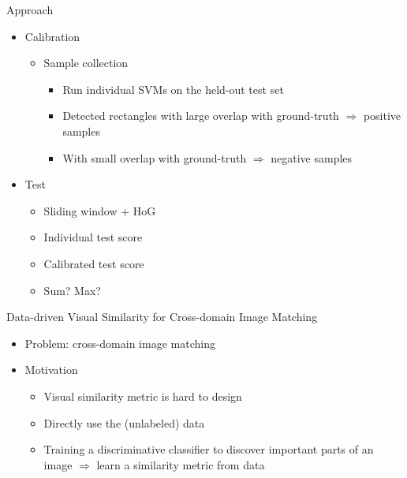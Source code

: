 \documentclass[12pt]{beamer}
\begin{document}
\begin{frame}{Approach}
	\begin{itemize}
		\item Calibration
		\begin{itemize}
			\item Sample collection
			\begin{itemize}
				\item Run individual SVMs on the held-out test set
                \item Detected rectangles with large overlap with ground-truth $\Rightarrow$ positive samples
				\item With small overlap with ground-truth $\Rightarrow$ negative samples
			\end{itemize}
		\end{itemize}
		\item Test
		\begin{itemize}
			\item Sliding window + HoG
			\item Individual test score
			\item Calibrated test score
			\item Sum? Max?
		\end{itemize}
	\end{itemize}
\end{frame}

\begin{frame}{Data-driven Visual Similarity for Cross-domain Image Matching}
	\begin{itemize}
		\item Problem: cross-domain image matching
		\item Motivation
		\begin{itemize}
			\item Visual similarity metric is hard to design
			\item Directly use the (unlabeled) data
			\item Training a discriminative classifier to discover important parts of an image $\Rightarrow$ learn a similarity metric from data
		\end{itemize}
	\end{itemize}
\end{frame}
\end{document}
